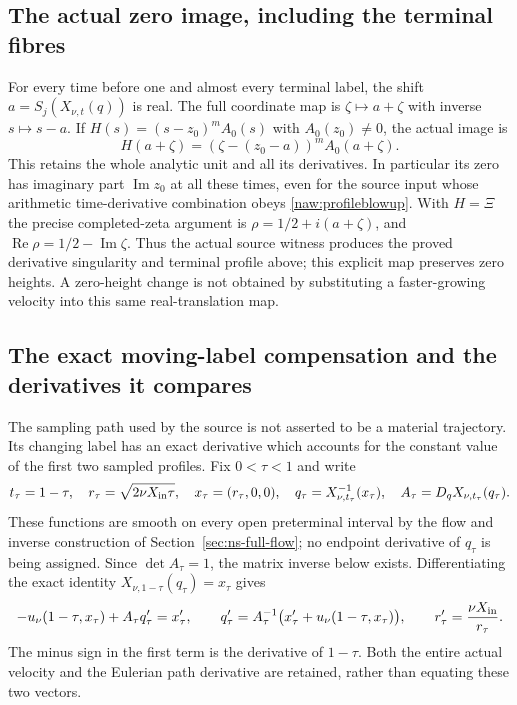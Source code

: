 \subsection{The actual zero image, including the terminal fibres}

For every time before one and almost every terminal label, the shift
$a=S_j(X_{\nu,t}(q))$ is real. The full coordinate map is
$\zeta\mapsto a+\zeta$ with inverse $s\mapsto s-a$. If
$H(s)=(s-z_0)^mA_0(s)$ with $A_0(z_0)\ne0$, the actual image is
\[
 H(a+\zeta)=(\zeta-(z_0-a))^mA_0(a+\zeta).
\]
This retains the whole analytic unit and all its derivatives. In
particular its zero has imaginary part $\operatorname{Im}z_0$ at all
these times, even for the source input whose arithmetic time-derivative
combination obeys \eqref{naw:profileblowup}. With $H=\Xi$ the precise
completed-zeta argument is $\rho=1/2+i(a+\zeta)$, and
$\operatorname{Re}\rho=1/2-\operatorname{Im}\zeta$. Thus the actual
source witness produces the proved derivative singularity and terminal
profile above; this explicit map preserves zero heights. A zero-height
change is not obtained by substituting a faster-growing velocity into
this same real-translation map.

\subsection{The exact moving-label compensation and the derivatives it compares}
\label{naw:moving-label}

The sampling path used by the source is not asserted to be a material
trajectory. Its changing label has an exact derivative which accounts
for the constant value of the first two sampled profiles. Fix
$0<\tau<1$ and write
\[
 t_\tau=1-\tau,\quad
 r_\tau=\sqrt{2\nu X_{\rm in}\tau},\quad
 x_\tau=(r_\tau,0,0),\quad
 q_\tau=X_{\nu,t_\tau}^{-1}(x_\tau),\quad
 A_\tau=D_qX_{\nu,t_\tau}(q_\tau).
\]
These functions are smooth on every open preterminal interval by the
flow and inverse construction of Section~\ref{sec:ns-full-flow};
no endpoint derivative of $q_\tau$ is being assigned.
Since $\det A_\tau=1$, the matrix inverse below exists. Differentiating
the exact identity $X_{\nu,1-\tau}(q_\tau)=x_\tau$ gives
\begin{equation}\label{naw:label-derivative}
 -u_\nu(1-\tau,x_\tau)+A_\tau q_\tau'=x_\tau',
 \qquad
 q_\tau'=A_\tau^{-1}\bigl(x_\tau'+u_\nu(1-\tau,x_\tau)\bigr),
 \qquad r_\tau'=\frac{\nu X_{\rm in}}{r_\tau}.
\end{equation}
The minus sign in the first term is the derivative of $1-\tau$.
Both the entire actual velocity and the Eulerian path derivative
are retained, rather than equating these two vectors.

